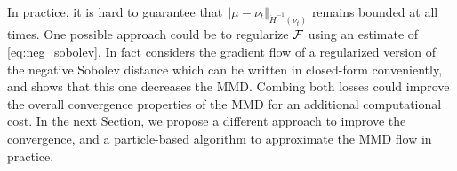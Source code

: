 In practice, it is hard to guarantee that $\Vert \mu - \nu_t \Vert_{\dot{H}^{-1}(\nu_t)} $ remains bounded at all times. One possible approach could be to regularize ${{\mathcal F}}$ using an estimate of \cref{eq:neg_sobolev}. In fact \cite{Mroueh:2019} considers the gradient flow of a regularized version of the negative Sobolev distance which can be written in closed-form conveniently, and shows that this one decreases the MMD. Combing both losses could improve the overall convergence properties of the MMD for an additional computational cost. In the next Section, we propose a different approach to improve the convergence, and a particle-based algorithm to approximate the MMD flow in practice.


 









